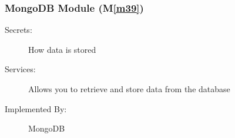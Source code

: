 \documentclass[12pt, titlepage]{article}
\newcommand{\mref}[1]{M\ref{#1}}
\begin{document}
	
	
	
	
	
	
	\subsubsection{MongoDB Module (\mref{m39})}
	
	\begin{description}
		\item[Secrets:] How data is stored
		\item[Services:] Allows you to retrieve and store data from the database
		\item[Implemented By:] MongoDB
	\end{description}
	
\end{document}
